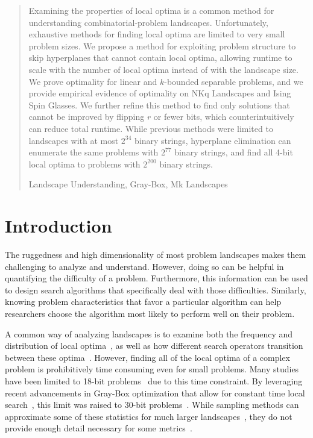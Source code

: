 \documentclass[runningheads,a4paper]{llncs}
\newcommand{\keywords}[1]{\par\addvspace\baselineskip
\noindent\keywordname\enspace\ignorespaces#1}
\begin{document}
\begin{abstract}
Examining the properties of local optima is a common method for understanding
combinatorial-problem landscapes.
Unfortunately,
exhaustive methods for finding local optima are limited to very small problem sizes.
We propose a method for exploiting problem structure
to skip hyperplanes
that cannot contain local optima, allowing runtime to scale with
the number of local optima instead of with the landscape size.
We prove optimality for linear and $k$-bounded separable problems, and we provide
empirical evidence of optimality on NKq Landscapes and Ising Spin Glasses.
We further refine this method to find only solutions
that cannot be improved by flipping $r$ or fewer bits, which counterintuitively
can reduce total runtime. While previous methods were limited to
landscapes with at most $2^{34}$ binary strings, hyperplane elimination can enumerate the same problems with
$2^{77}$ binary strings, and find all 4-bit local optima to problems with $2^{200}$ binary strings.



\keywords{Landscape Understanding, Gray-Box, Mk Landscapes}
\end{abstract}


\section{Introduction}
The ruggedness and high dimensionality of most problem landscapes makes them challenging to
analyze and understand. However, doing so can be helpful in
quantifying the difficulty of a problem. Furthermore,
this information can be used to design search algorithms that specifically deal
with those difficulties. 
Similarly, knowing problem characteristics that favor
a particular
algorithm can help researchers choose the algorithm
most likely to perform well on their problem.

A common way of analyzing landscapes is to
examine both the frequency and distribution of local optima~\cite{boese:1994:bigvalley},
as well as how different search operators transition between these
optima~\cite{tomassini:2008:nknetworks,verel:2011:nknetworks,ochoa:2015:crossovernetworks}.
However, finding all of the local optima of a complex problem is prohibitively time consuming
even for small problems. Many studies have been limited to 18-bit
problems~\cite{tomassini:2008:nknetworks,verel:2011:nknetworks} due to this time constraint.
By leveraging recent advancements in Gray-Box optimization that allow for
constant time local search~\cite{chicano:2014:ball}, this limit was raised
to 30-bit problems~\cite{ochoa:2015:crossovernetworks}. While sampling
methods can approximate some of these statistics for much larger
landscapes~\cite{iclanzan:2014:somnetworks}, they do not provide enough
detail necessary for some metrics~\cite{ochoa:2015:crossovernetworks}.
\end{document}
